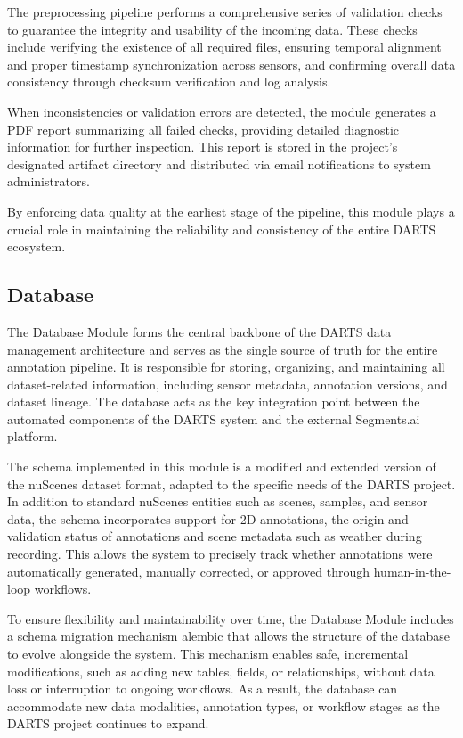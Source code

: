 \documentclass[conference]{IEEEtran}
\begin{document}
The preprocessing pipeline performs a comprehensive series of validation checks to guarantee the integrity and usability of the incoming data. These checks include verifying the existence of all required files, ensuring temporal alignment and proper timestamp synchronization across sensors, and confirming overall data consistency through checksum verification and log analysis.

When inconsistencies or validation errors are detected, the module generates a PDF report summarizing all failed checks, providing detailed diagnostic information for further inspection. This report is stored in the project’s designated artifact directory and distributed via email notifications to system administrators.

By enforcing data quality at the earliest stage of the pipeline, this module plays a crucial role in maintaining the reliability and consistency of the entire DARTS ecosystem.

\subsection{Database}
The Database Module forms the central backbone of the DARTS data management architecture and serves as the single source of truth for the entire annotation pipeline. It is responsible for storing, organizing, and maintaining all dataset-related information, including sensor metadata, annotation versions, and dataset lineage. The database acts as the key integration point between the automated components of the DARTS system and the external Segments.ai platform.

The schema implemented in this module is a modified and extended version of the nuScenes dataset format, adapted to the specific needs of the DARTS project. In addition to standard nuScenes entities such as scenes, samples, and sensor data, the schema incorporates support for 2D annotations, the origin and validation status of annotations and scene metadata such as weather during recording. This allows the system to precisely track whether annotations were automatically generated, manually corrected, or approved through human-in-the-loop workflows.

To ensure flexibility and maintainability over time, the Database Module includes a schema migration mechanism alembic that allows the structure of the database to evolve alongside the system. This mechanism enables safe, incremental modifications, such as adding new tables, fields, or relationships, without data loss or interruption to ongoing workflows. As a result, the database can accommodate new data modalities, annotation types, or workflow stages as the DARTS project continues to expand.
\end{document}
